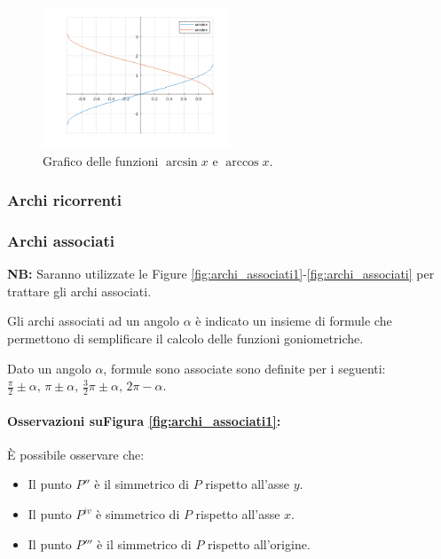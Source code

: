 \begin{figure}
    \centering
    \includegraphics[width=0.5\textwidth]{Analisi1/figures/arcsincosx.png}
    \caption{Grafico delle funzioni $\arcsin x$ e $\arccos x$.}
    \label{fig:arcsincosx}
\end{figure}

\subsubsection{Archi ricorrenti}

\subsubsection{Archi associati}

\textbf{NB:} Saranno utilizzate le Figure \ref{fig:archi_associati1}-\ref{fig:archi_associati} per trattare gli archi associati.

Gli archi associati ad un angolo $\alpha$ è indicato un insieme di formule che permettono di semplificare il calcolo delle funzioni goniometriche.

\begin{definition}
    Dato un angolo $\alpha$, formule sono associate sono definite per i seguenti: $\frac{\pi}{2}\pm\alpha,\, \pi \pm \alpha,\, \frac{3}{2}\pi\pm\alpha,\, 2\pi - \alpha$.
\end{definition}

\paragraph{Osservazioni suFigura \ref{fig:archi_associati1}:} È possibile osservare che:
\begin{itemize}
    \item Il punto $P''$ è il simmetrico di $P$ rispetto all'asse $y$.
    \item Il punto $P^{iv}$ è simmetrico di $P$ rispetto all'asse $x$.
    \item Il punto $P'''$ è il simmetrico di $P$ rispetto all'origine.
\end{itemize}

